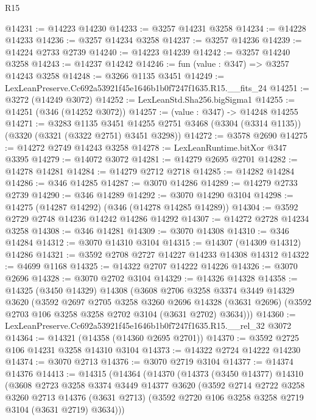 \begin{lexlean}{R15}
\begin{coremodule}
@14231 := @14223 @14230
@14233 := @3257 @14231 @3258
@14234 := @14228 @14233
@14236 := @3257 @14234 @3258
@14237 := @3257 @14236
@14239 := @14224 @2733 @2739
@14240 := @14223 @14239
@14242 := @3257 @14240 @3258
@14243 := @14237 @14242
@14246 := fun (value : @347) => @3257 @14243 @3258
@14248 := @3266 @1135 @3451
@14249 := LexLeanPreserve.Cc692a53921f45e1646b1b0f7247f1635.R15.__fits_24
@14251 := @3272 (@14249 @3072)
@14252 := LexLeanStd.Sha256.bigSigma1
@14255 := @14251 (@346 (@14252 @3072))
@14257 := (value : @347) -> @14248 @14255
@14271 := @3283
    @1135
    @3451
    @14255
    @2751
    @3468
    (@3304 (@3314 @1135))
    (@3320 (@3321 (@3322 @2751) @3451 @3298))
@14272 := @3578 @2690
@14275 := @14272 @2749 @14243 @3258
@14278 := LexLeanRuntime.bitXor @347 @3395
@14279 := @14072 @3072
@14281 := @14279 @2695 @2701
@14282 := @14278 @14281
@14284 := @14279 @2712 @2718
@14285 := @14282 @14284
@14286 := @346 @14285
@14287 := @3070 @14286
@14289 := @14279 @2733 @2739
@14290 := @346 @14289
@14292 := @3070 @14290 @3104
@14298 := @14275 (@14287 @14292) (@346 (@14278 @14285 @14289))
@14304 := @3592 @2729 @2748 @14236 @14242 @14286 @14292
@14307 := @14272 @2728 @14234 @3258
@14308 := @346 @14281
@14309 := @3070 @14308
@14310 := @346 @14284
@14312 := @3070 @14310 @3104
@14315 := @14307 (@14309 @14312) @14286
@14321 := @3592 @2708 @2727 @14227 @14233 @14308 @14312
@14322 := @4699 @1168
@14325 := @14322 @2707 @14222 @14226
@14326 := @3070 @2696
@14328 := @3070 @2702 @3104
@14329 := @14326 @14328
@14358 := @14325
    (@3450 @14329)
    @14308
    (@3608
      @2706
      @3258
      @3374
      @3449
      @14329
      @3620
      (@3592
        @2697
        @2705
        @3258
        @3260
        @2696
        @14328
        (@3631 @2696)
        (@3592 @2703 @106 @3258 @3258 @2702 @3104 (@3631 @2702) @3634)))
@14360 := LexLeanPreserve.Cc692a53921f45e1646b1b0f7247f1635.R15.__rel_32 @3072
@14364 := @14321 (@14358 (@14360 @2695 @2701))
@14370 := @3592 @2725 @106 @14231 @3258 @14310 @3104
@14373 := @14322 @2724 @14222 @14230
@14374 := @3070 @2713
@14376 := @3070 @2719 @3104
@14377 := @14374 @14376
@14413 := @14315
    (@14364
      (@14370
        (@14373
          (@3450 @14377)
          @14310
          (@3608
            @2723
            @3258
            @3374
            @3449
            @14377
            @3620
            (@3592
              @2714
              @2722
              @3258
              @3260
              @2713
              @14376
              (@3631 @2713)
              (@3592 @2720 @106 @3258 @3258 @2719 @3104 (@3631 @2719) @3634)))

\end{coremodule}
\end{lexlean}
